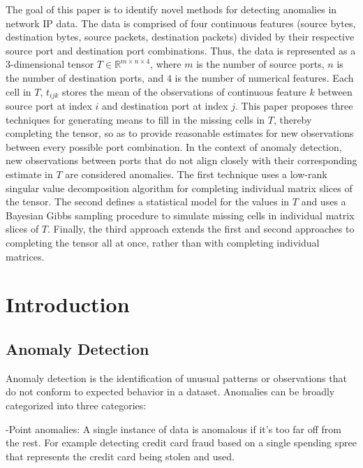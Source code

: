 \documentclass[12pt,twoside]{dukestatscithesis}
\theoremstyle{definition}
\theoremstyle{definition}
\theoremstyle{definition}
\theoremstyle{remark}
\begin{document}
\mainmatter %
\pagestyle{fancyplain} %

The goal of this paper is to identify novel methods for detecting
anomalies in network IP data. The data is comprised of four continuous
features (source bytes, destination bytes, source packets, destination
packets) divided by their respective source port and destination port
combinations. Thus, the data is represented as a 3-dimensional tensor
\(T \in \mathbb{R}^{m \times n \times 4}\), where \(m\) is the number of
source ports, \(n\) is the number of destination ports, and \(4\) is the
number of numerical features. Each cell in \(T\), \(t_{ijk}\) stores the
mean of the observations of continuous feature \(k\) between source port
at index \(i\) and destination port at index \(j\). This paper proposes
three techniques for generating means to fill in the missing cells in
\(T\), thereby completing the tensor, so as to provide reasonable
estimates for new observations between every possible port combination.
In the context of anomaly detection, new observations between ports that
do not align closely with their corresponding estimate in \(T\) are
considered anomalies. The first technique uses a low-rank singular value
decomposition algorithm for completing individual matrix slices of the
tensor. The second defines a statistical model for the values in \(T\)
and uses a Bayesian Gibbs sampling procedure to simulate missing cells
in individual matrix slices of \(T\). Finally, the third approach
extends the first and second approaches to completing the tensor all at
once, rather than with completing individual matrices.

\chapter{Introduction}\label{introduction}

\section{Anomaly Detection}\label{anomaly-detection}

Anomaly detection is the identification of unusual patterns or
observations that do not conform to expected behavior in a dataset.
Anomalies can be broadly categorized into three categories:

-Point anomalies: A single instance of data is anomalous if it's too far
off from the rest. For example detecting credit card fraud based on a
single spending spree that represents the credit card being stolen and
used.
\end{document}
